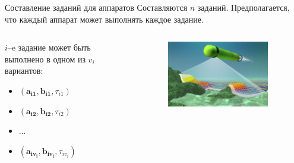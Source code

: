 \documentclass{beamer}
\begin{document}
\begin{frame}{Составление заданий для аппаратов}
Составляются $n$ заданий. Предполагается, что каждый аппарат может выполнять каждое задание.
\begin{columns}[onlytextwidth, t]
    \begin{column}{0.6\textwidth}

        $i$--e задание может быть выполнено в одном из $v_i$ вариантов:
        \begin{itemize}
        \item $(\mathbf{a_{i 1}}, \mathbf{b_{i 1}}, \tau_{i 1})$
        \item $(\mathbf{a_{i 2}}, \mathbf{b_{i 2}}, \tau_{i 2})$
        \item $...$
        \item $(\mathbf{a_{i v_i}}, \mathbf{b_{i v_i}}, \tau_{i v_i})$
        \end{itemize}

    \end{column}
    \begin{column}{0.4\textwidth}

        \begin{figure}[here]
            \includegraphics[scale=0.4]{images/AUV5.JPG}
        \end{figure}
    \end{column}

​\end{columns}
\end{frame}
\end{document}
